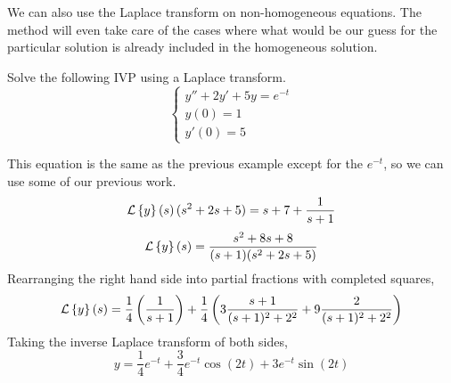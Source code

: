 \noindent
We can also use the Laplace transform on non-homogeneous equations. The method will even take care of the cases where what would be our guess for the particular solution is already included in the homogeneous solution.
\begin{example}
	Solve the following IVP using a Laplace transform.
	\begin{equation*}
		\begin{cases}
			y'' + 2y' + 5y = e^{-t} \\
			y(0) = 1 \\
			y'(0) = 5
		\end{cases}
	\end{equation*}
\end{example}
\noindent
This equation is the same as the previous example except for the $e^{-t}$, so we can use some of our previous work.
\begin{equation*}
	\mathcal{L}\left\{ y \right\}\left(s\right)(s^2 + 2s + 5) = s + 7 + \frac{1}{s+1}
\end{equation*}
\begin{equation*}
	 \mathcal{L}\left\{ y \right\}\left(s\right) = \frac{s^2 + 8s + 8}{(s+1)(s^2 + 2s + 5)}
\end{equation*}
Rearranging the right hand side into partial fractions with completed squares,
\begin{equation*}
	\mathcal{L}\left\{ y \right\}\left(s\right) = \frac{1}{4}\left(\frac{1}{s+1}\right) + \frac{1}{4}\left(3\frac{s+1}{(s+1)^2 + 2^2} + 9\frac{2}{(s+1)^2 + 2^2}\right)
\end{equation*}
Taking the inverse Laplace transform of both sides,
\begin{equation*}
	y = \frac{1}{4}e^{-t} + \frac{3}{4}e^{-t}\cos{(2t)} + 3e^{-t}\sin{(2t)}
\end{equation*}